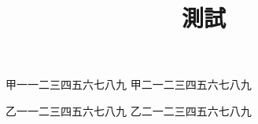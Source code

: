 \documentclass[四库全书]{ltc-guji}
\title{測試}
\begin{document}
\begin{正文}
甲一一二三四五六七八九
甲二一二三四五六七八九
\end{正文}

\begin{正文}
乙一一二三四五六七八九
乙二一二三四五六七八九
\end{正文}
\end{document}
